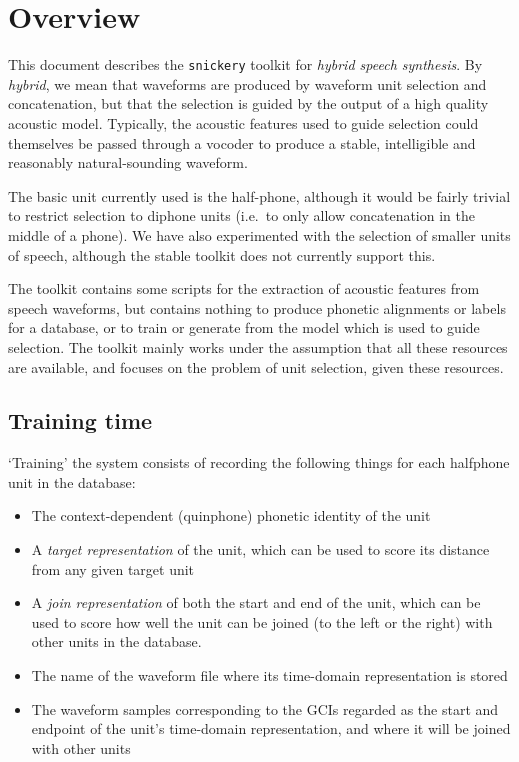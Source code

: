 

\section{Overview}

This document describes the {\tt snickery} toolkit for \textit{hybrid speech synthesis}. By \textit{hybrid}, we mean that waveforms are produced by waveform unit selection and concatenation, but that the selection is guided by the output of a high quality acoustic model. Typically, the acoustic features used to guide selection could themselves be passed through a vocoder to produce a stable, intelligible and reasonably natural-sounding waveform. 

The basic unit currently used is the half-phone, although it would be fairly trivial to restrict selection to diphone units (i.e.\ to only allow concatenation in the middle of a phone). We have also experimented with the selection of smaller units of speech, although the stable toolkit does not currently support this.

The toolkit contains some scripts for the extraction of acoustic features from speech waveforms, but contains nothing to produce phonetic alignments or labels for a database, or to train or generate from the model which is used to guide selection. The toolkit mainly works under the assumption that all these resources are available, and focuses on the problem of unit selection, given these resources. 



\subsection{Training time}

`Training' the system consists of recording the following things for each halfphone unit in the database:

\begin{itemize}
    \item The context-dependent (quinphone) phonetic identity of the unit %
    \item A \textit{target representation} of the unit, which can be used to score its distance from any given target unit  %
    \item A \textit{join representation} of both the start and end of the unit, which can be used to score how well the unit can be joined (to the left or the right) with other units in the database. %
    \item The name of the waveform file where its time-domain representation is stored %
    \item The waveform samples corresponding to the GCIs regarded as the start and endpoint of the unit's time-domain representation, and where it will be joined with other units %
\end{itemize}

